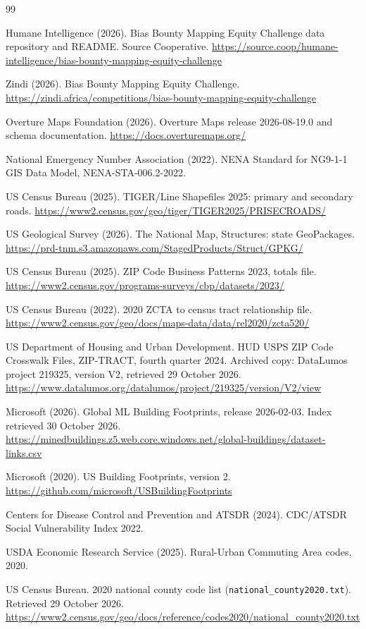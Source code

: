 \documentclass[11pt]{article}
\begin{document}
\begin{thebibliography}{99}

Humane Intelligence (2026). Bias Bounty Mapping Equity Challenge data
repository and README. Source Cooperative.
\url{https://source.coop/humane-intelligence/bias-bounty-mapping-equity-challenge}

Zindi (2026). Bias Bounty Mapping Equity Challenge.
\url{https://zindi.africa/competitions/bias-bounty-mapping-equity-challenge}

Overture Maps Foundation (2026). Overture Maps release 2026-08-19.0 and
schema documentation. \url{https://docs.overturemaps.org/}

National Emergency Number Association (2022). NENA Standard for NG9-1-1 GIS
Data Model, NENA-STA-006.2-2022.

US Census Bureau (2025). TIGER/Line Shapefiles 2025: primary and secondary
roads. \url{https://www2.census.gov/geo/tiger/TIGER2025/PRISECROADS/}

US Geological Survey (2026). The National Map, Structures: state
GeoPackages. \url{https://prd-tnm.s3.amazonaws.com/StagedProducts/Struct/GPKG/}

US Census Bureau (2025). ZIP Code Business Patterns 2023, totals file.
\url{https://www2.census.gov/programs-surveys/cbp/datasets/2023/}

US Census Bureau (2022). 2020 ZCTA to census tract relationship file.
\url{https://www2.census.gov/geo/docs/maps-data/data/rel2020/zcta520/}

US Department of Housing and Urban Development. HUD USPS ZIP Code
Crosswalk Files, ZIP-TRACT, fourth quarter 2024. Archived copy: DataLumos
project 219325, version V2, retrieved 29 October 2026.
\url{https://www.datalumos.org/datalumos/project/219325/version/V2/view}

Microsoft (2026). Global ML Building Footprints, release 2026-02-03. Index
retrieved 30 October 2026.
\url{https://minedbuildings.z5.web.core.windows.net/global-buildings/dataset-links.csv}

Microsoft (2020). US Building Footprints, version 2.
\url{https://github.com/microsoft/USBuildingFootprints}

Centers for Disease Control and Prevention and ATSDR (2024). CDC/ATSDR Social
Vulnerability Index 2022.

USDA Economic Research Service (2025). Rural-Urban Commuting Area codes,
2020.

US Census Bureau. 2020 national county code list
(\texttt{national\_county2020.txt}). Retrieved 29 October 2026.
\url{https://www2.census.gov/geo/docs/reference/codes2020/national_county2020.txt}

\end{thebibliography}
\end{document}
